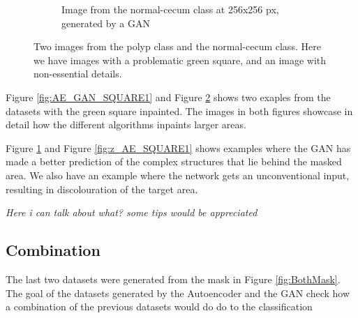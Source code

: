 \begin{figure}
\begin{subfigure}[t]{0.4\textwidth}
            \caption{Image from the normal-cecum class at 256x256 px, generated by a GAN }  
            \label{fig:nc_GAN_SQUARE2}
        \end{subfigure}
        \caption{Two images from the polyp class and the normal-cecum class. Here we have images with a problematic green square, and an image with non-essential details.} 
        \label{fig:AE_GAN_SQUARE2}
    \end{figure}
    
Figure \ref{fig:AE_GAN_SQUARE1} and Figure \ref{fig:AE_GAN_SQUARE2} shows two exaples from the datasets with the green square inpainted.
The images in both figures showcase in detail how the different algorithms inpaints larger areas. 

Figure \ref{fig:nc_GAN_SQUARE2} and Figure \ref{fig:z_AE_SQUARE1} shows examples where the GAN has made a better prediction of the complex structures that lie behind the masked area.
We also have an example where the network gets an unconventional input, resulting in discolouration of the target area.       

\vspace{5px}
\textit{Here i can talk about what? some tips would be appreciated }

  
\subsection{Combination}
The last two datasets were generated from the mask in Figure \ref{fig:BothMask}. The goal of the datasets generated by the Autoencoder and the GAN check how a combination of the previous datasets would do do to the classification

